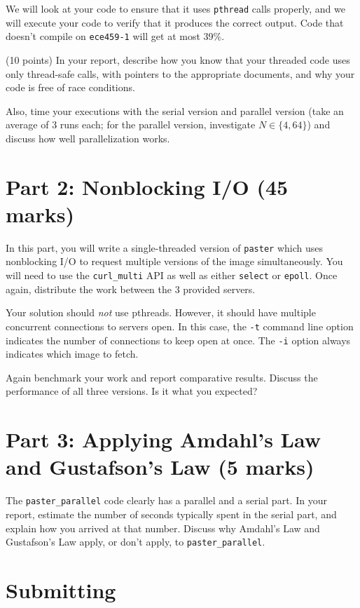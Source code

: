 \documentclass[letterpaper,10pt]{article}
\begin{document}
We will look at your code to ensure that it uses {\tt pthread} calls 
properly, and we will execute your code to verify that it produces the
correct output. Code that doesn't compile on {\tt ece459-1} will get at most
39\%.

\vspace*{1em} \noindent (10 points) In your report, describe how you know that your threaded
code uses only thread-safe calls, with pointers to the appropriate
documents, and why your code is free of race conditions.

Also, time your executions with the serial version and parallel version 
(take an average of 3 runs each; for the parallel version, investigate $N \in \{4, 64\}$) and discuss how well parallelization works.

\section*{Part 2: Nonblocking I/O (45 marks)}

In this part, you will write a single-threaded version of {\tt paster}
which uses nonblocking I/O to request multiple versions of the image
simultaneously.  You will need to use the {\tt curl\_multi} API as
well as either {\tt select} or {\tt epoll}. Once again, distribute the
work between the 3 provided servers.

Your solution should \emph{not} use pthreads. However, it should have multiple
concurrent connections to servers open. In this case, the {\tt -t} command
line option indicates the number of connections to keep open at once.
The {\tt -i} option always indicates which image to fetch.

\vspace*{1em} Again benchmark your work and report comparative results.
Discuss the performance of all three versions. Is it what you expected?


\section*{Part 3: Applying Amdahl's Law and Gustafson's Law (5 marks)}
The {\tt paster\_parallel} code clearly has a parallel and a serial part.
In your report, estimate the number of seconds typically spent in the serial part,
and explain how you arrived at that number. Discuss why Amdahl's Law and Gustafson's Law
apply, or don't apply, to {\tt paster\_parallel}.

\section*{Submitting}
\end{document}

